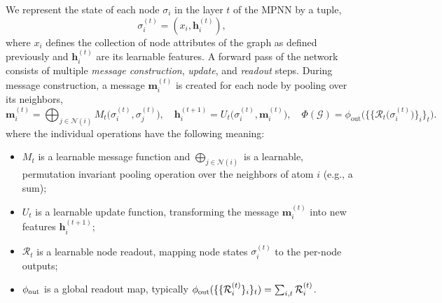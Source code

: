 \documentclass{article} \usepackage{iclr2024_conference,times}
\begin{document}
We represent the state of each node $\sigma_i$ in the layer $t$ of the MPNN by a tuple,
\begin{equation}
  \sigma_{i}^{(t)} = (x_{i}, \boldsymbol{h}_{i}^{(t)}),
\end{equation}
where $x_{i}$ defines the collection of node attributes of the graph as defined previously and $\boldsymbol{h}_{i}^{(t)}$ are its learnable features.
A forward pass of the network consists of multiple \textit{message construction}, \emph{update}, and \emph{readout} steps.
During message construction, a message $\boldsymbol{m}_i^{(t)}$ is created for each node by pooling over its neighbors,
\begin{equation}
  \label{eqn:mpnn-equations}
  \boldsymbol{m}_i^{(t)} = \bigoplus_{j \in \mathcal{N}(i)} M_t\big(\sigma_i^{(t)}, \sigma_j^{(t)}\big), 
  \quad   \boldsymbol{h}_i^{(t+1)} = U_t\big(\sigma_i^{(t)}, \boldsymbol{m}_i^{(t)}\big), 
  \quad   \Phi(\mathcal{G}) = \phi_{\text{out}}\bigg( \Big\{  \big\{ \mathcal{R}_t\big(\sigma^{(t)}_i\big) \big\}_i \Big\}_{t}\bigg).
\end{equation}
where the individual operations have the following meaning: \\[-7mm]
\begin{itemize}
    \item $M_t$ is a learnable message function and
$\bigoplus_{j \in \mathcal{N}(i)}$ is a learnable, permutation invariant pooling operation over the neighbors of atom $i$ (e.g., a sum); \\[-5mm]
    \item $U_t$ is a learnable update function, transforming the message $\boldsymbol{m}_i^{(t)}$ into new features $\boldsymbol{h}_i^{(t+1)}$; \\[-5mm]
    \item $\mathcal{R}_t$ is a learnable node readout, mapping node states $\sigma_i^{(t)}$ to the per-node outputs; \\[-5mm]
    \item $\phi_{\rm out}$ is a global readout map, typically 
    $\phi_{\rm out}(\{\{ \mathcal{R}_{i}^{(t)}\}_i \}_t)
    = \sum_{i, t} \mathcal{R}_i^{(t)}$.
\end{itemize}
\end{document}
